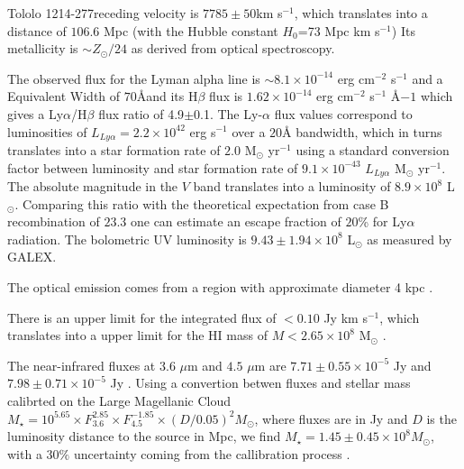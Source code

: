 \documentclass[a4paper, usenatbib, 12pt]{article}
\newcommand{\tol}{Tololo 1214-277}
\begin{document}
{%
\tol receding velocity is $7785\pm 50$km s$^{-1}$, which translates
into a distance of $106.6$ Mpc (with the Hubble constant $H_{0}$=73
Mpc km s$^{-1}$) 
Its metallicity is $\sim Z_{\odot}/24$ \cite{Izotov04} as derived from optical
spectroscopy. 


The observed flux for the Lyman alpha line is $\sim
8.1\times 10^{-14}$ erg cm$^{-2}$ s$^{-1}$ \cite{Thuan97}
and a Equivalent Width of $70$\AA and its H$\beta$ flux is 
$1.62\times 10^{-14}$ erg cm$^{-2}$ s$^{-1}$ \AA${-1}$
\cite{Izotov04} which gives a Ly$\alpha$/H$\beta$ flux ratio of
4.9$\pm$0.1. The Ly-$\alpha$ flux values correspond to luminosities of
$L_{Ly\alpha}=2.2\times 10^{42}$ erg s$^{-1}$ over a $20$\AA
bandwidth, which in turns translates  into a star formation rate of
$2.0$ M$_{\odot}$ yr$^{-1}$ using a standard conversion factor between
luminosity and star formation rate of $9.1\times 10^{-43}$
$L_{Ly\alpha}$ M$_{\odot}$ yr$^{-1}$. 
The absolute magnitude in the $V$ band translates into a luminosity of
$8.9\times 10^{8}$ L$_{\odot}$.
Comparing this ratio with the theoretical expectation from case B
recombination of $23.3$ \cite{Hummer1987} one can estimate an escape
fraction of $20$\% for Ly$\alpha$ radiation.
The bolometric UV luminosity is $9.43\pm1.94 \times 10^{8}$
L$_{\odot}$ as measured by GALEX. 

The optical emission  comes from a   region with approximate diameter
4 kpc \cite{Fricke01}. 

There is an upper limit for the  
integrated flux of $<0.10$ Jy km s$^{-1}$, which translates into a
upper limit for the HI mass of $M<2.65\times 10^{8}$ M$_{\odot}$
\cite{pustilnikmartin07}.  

The near-infrared fluxes at $3.6$ $\mu$m and $4.5$ $\mu$m are
$7.71\pm0.55\times 10^{-5}$ Jy and $7.98\pm0.71\times 10^{-5}$ Jy
\cite{2008ApJ...678..804E}.  Using a convertion betwen fluxes and
stellar mass calibrted on the Large Magellanic Cloud $M_{\star} =
10^{5.65} \times F_{3.6}^{2.85} \times F_{4.5}^{-1.85} \times
(D/0.05)^2 M_{\odot}$, where fluxes are in Jy and $D$ is the luminosity
distance to the source in Mpc, we find $M_{\star} = 1.45\pm0.45\times 10^{8}
M_{\odot}$, with a $30\%$ uncertainty coming from the callibration
process \cite{2012AJ....143..139E}.  



}
\end{document}
